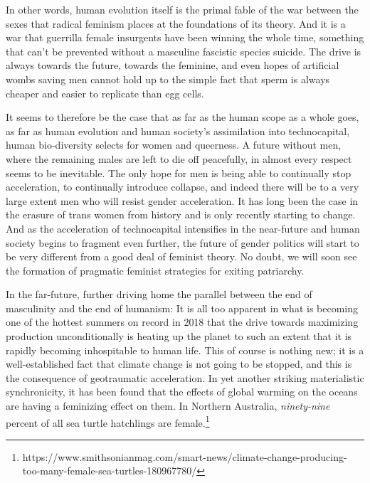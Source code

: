 \documentclass[12pt, a5paper, twoside, openright]{memoir}
\begin{document}
In other words, human evolution itself is the primal fable of the war between the sexes that radical feminism places at the foundations of its theory. And it is a war that guerrilla female insurgents have been winning the whole time, something that can't be prevented without a masculine fascistic species suicide. The drive is always towards the future, towards the feminine, and even hopes of artificial wombs saving men cannot hold up to the simple fact that sperm is always cheaper and easier to replicate than egg cells.

It seems to therefore be the case that as far as the human scope as a whole goes, as far as human evolution and human society's assimilation into technocapital, human bio-diversity selects for women and queerness. A future without men, where the remaining males are left to die off peacefully, in almost every respect seems to be inevitable. The only hope for men is being able to continually stop acceleration, to continually introduce collapse, and indeed there will be to a very large extent men who will resist gender acceleration. It has long been the case in the erasure of trans women from history and is only recently starting to change. And as the acceleration of technocapital intensifies in the near-future and human society begins to fragment even further, the future of gender politics will start to be very different from a good deal of feminist theory. No doubt, we will soon see the formation of pragmatic feminist strategies for exiting patriarchy.

In the far-future, further driving home the parallel between the end of masculinity and the end of humanism: It is all too apparent in what is becoming one of the hottest summers on record in 2018 that the drive towards maximizing production unconditionally is heating up the planet to such an extent that it is rapidly becoming inhospitable to human life. This of course is nothing new; it is a well-established fact that climate change is not going to be stopped, and this is the consequence of geotraumatic acceleration. In yet another striking materialistic synchronicity, it has been found that the effects of global warming on the oceans are having a feminizing effect on them. In Northern Australia, \emph{ninety-nine} percent of all sea turtle hatchlings are female.\footnote{https://www.smithsonianmag.com/smart-news/climate-change-producing-too-many-female-sea-turtles-180967780/}
\end{document}
